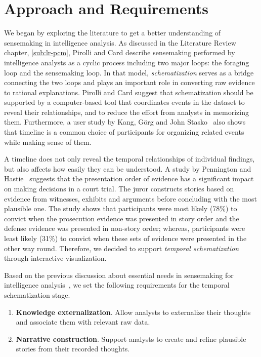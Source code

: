 \section{Approach and Requirements}
We began by exploring the literature to get a better understanding of sensemaking in intelligence analysis. As discussed in the Literature Review chapter, \autoref{sub:lr-pcm}, Pirolli and Card describe sensemaking performed by intelligence analysts as a cyclic process including two major loops: the foraging loop and the sensemaking loop. In that model, \emph{schematization} serves as a bridge connecting the two loops and plays an important role in converting raw evidence to rational explanations. Pirolli and Card suggest that schematization should be supported by a computer-based tool that coordinates events in the dataset to reveal their relationships, and to reduce the effort from analysts in memorizing them. Furthermore, a user study by Kang, Görg and John Stasko~\cite{Kang2011} also shows that timeline is a common choice of participants for organizing related events while making sense of them.

A timeline does not only reveal the temporal relationships of individual findings, but also affects how easily they can be understood. A study by Pennington and Hastie~\cite{Pennington1991} suggests that the presentation order of evidence has a significant impact on making decisions in a court trial. The juror constructs stories based on evidence from witnesses, exhibits and arguments before concluding with the most plausible one. The study shows that participants were most likely (78\%) to convict when the prosecution evidence was presented in story order and the defense evidence was presented in non-story order; whereas, participants were least likely (31\%) to convict when these sets of evidence were presented in the other way round. Therefore, we decided to support \emph{temporal schematization} through interactive visualization.

Based on the previous discussion about essential needs in sensemaking for intelligence analysis~\cite{Heuer1999,Pirolli2005}, we set the following requirements for the temporal schematization stage.

\begin{enumerate}
	\item \textbf{Knowledge externalization}. Allow analysts to externalize their thoughts and associate them with relevant raw data.
	\item \textbf{Narrative construction}. Support analysts to create and refine plausible stories from their recorded thoughts.
\end{enumerate}

